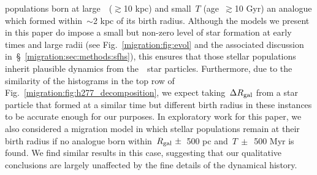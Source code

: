 populations born at large~\rgal~($\gtrsim$10 kpc) and small~$T$ 
(age~$\gtrsim$10 Gyr) an analogue which formed within~$\sim$2 kpc of its birth 
radius. 
Although the models we present in this paper do impose a small but non-zero 
level of star formation at early times and large radii (see Fig.~\ref{migration:fig:evol} 
and the associated discussion in~\S~\ref{migration:sec:methods:sfhs}), this ensures that 
those stellar populations inherit plausible dynamics from the~\hsim~star 
particles. 
Furthermore, due to the similarity of the histograms in the top row of 
Fig.~\ref{migration:fig:h277_decomposition}, we expect taking~$\Delta R_\text{gal}$ from 
a star particle that formed at a similar time but different birth radius in 
these instances to be accurate enough for our purposes. 
In exploratory work for this paper, we also considered a migration model in 
which stellar populations remain at their birth radius if no analogue born 
within~$R_\text{gal}~\pm$~500 pc and~$T~\pm$~500 Myr is found. 
We find similar results in this case, suggesting that our qualitative 
conclusions are largely unaffected by the fine details of the dynamical 
history. 

